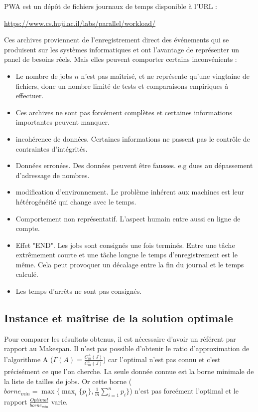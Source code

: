 \documentclass[a4paper,12pt]{report}
\theoremstyle{plain}				%
\theoremstyle{definition}				%
\begin{document}
   
PWA est un dépôt de fichiers journaux de temps disponible à 
  l'URL :
  
\url{https://www.cs.huji.ac.il/labs/parallel/workload/}

Ces archives proviennent de l'enregistrement direct des événements qui se produisent sur les systèmes informatiques et ont l'avantage de représenter un panel de besoins réels. 
Mais elles peuvent comporter certains inconvénients : 
\begin{itemize}

	\item Le nombre de jobs $n$ n'est pas maîtrisé, et ne représente qu'une 
	vingtaine de fichiers, donc un nombre limité de tests et comparaisons empiriques à effectuer.
	
	\item Ces archives ne sont pas forcément complètes et certaines informations importantes peuvent manquer.
	
	\item incohérence de données. Certaines informations ne passent pas le contrôle de 
	contraintes d'intégrités.
	
	\item Données erronées. Des données peuvent être fausses. e.g dues au dépassement d'adressage de nombres.
	
	\item modification d'environnement. Le problème inhérent aux machines 
	est leur hétérogénéité qui change avec le temps.
	
	\item Comportement non représentatif. L'aspect humain entre aussi en ligne de compte.
	
	\item Effet "END". Les jobs sont consignés une fois terminés. 
	Entre une tâche extrêmement courte et une tâche longue le temps 
	d'enregistrement est le même. Cela peut provoquer un décalage 
	entre la fin du journal et le temps calculé.
	
	\item Les temps d'arrêts ne sont pas consignés. 
	  
\end{itemize}

\subsection{Instance et maîtrise de la solution optimale}
\label{ssec:instancesMaitriseSolutionOptimale}

Pour comparer les résultats obtenus, il est nécessaire d'avoir un référent par rapport au Makespan. 
Il n'est pas possible d'obtenir le ratio d'approximation de l'algorithme A ($\Gamma(A)=\frac{C_m^A(J)}{C_m^\star(J)}$) car l'optimal n'est pas connu et c'est précisément ce que l'on cherche. 
La seule donnée connue est la borne minimale de la liste de tailles de jobs.
Or cette borne ($borne_{min} = \max \{ \max_i\{p_i\}, \frac{1}{m} \sum_{i=1}^{n} p_i \}$) n'est pas forcément l'optimal et le rapport $\frac{Optimal}{borne_{min}}$ varie.
\end{document}
